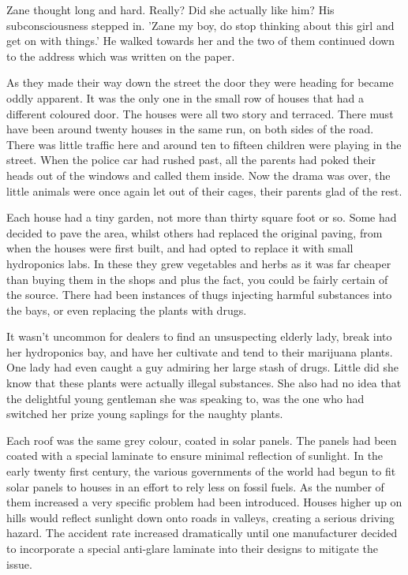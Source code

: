 Zane thought long and hard.  Really?  Did she actually like him?  His subconsciousness stepped in.  'Zane my boy, do stop thinking about this girl and get on with things.'  He walked towards her and the two of them continued down to the address which was written on the paper.

As they made their way down the street the door they were heading for became oddly apparent.  It was the only one in the small row of houses that had a different coloured door.  The houses were all two story and terraced.  There must have been around twenty houses in the same run, on both sides of the road.  There was little traffic here and around ten to fifteen children were playing in the street.  When the police car had rushed past, all the parents had poked their heads out of the windows and called them inside.  Now the drama was over, the little animals were once again let out of their cages, their parents glad of the rest.

Each house had a tiny garden, not more than thirty square foot or so.  Some had decided to pave the area, whilst others had replaced the original paving, from when the houses were first built, and had opted to replace it with small hydroponics labs.  In these they grew vegetables and herbs as it was far cheaper than buying them in the shops and plus the fact, you could be fairly certain of the source.  There had been instances of thugs injecting harmful substances into the bays, or even replacing the plants with drugs.  

It wasn't uncommon for dealers to find an unsuspecting elderly lady, break into her hydroponics bay, and have her cultivate and tend to their marijuana plants.  One lady had even caught a guy admiring her large stash of drugs.  Little did she know that these plants were actually illegal substances.  She also had no idea that the delightful young gentleman she was speaking to, was the one who had switched her prize young saplings for the naughty plants.

Each roof was the same grey colour, coated in solar panels.  The panels had been coated with a special laminate to ensure minimal reflection of sunlight.  In the early twenty first century, the various governments of the world had begun to fit solar panels to houses in an effort to rely less on fossil fuels.  As the number of them increased a very specific problem had been introduced.  Houses higher up on hills would reflect sunlight down onto roads in valleys, creating a serious driving hazard.  The accident rate increased dramatically until one manufacturer decided to incorporate a special anti-glare laminate into their designs to mitigate the issue.

